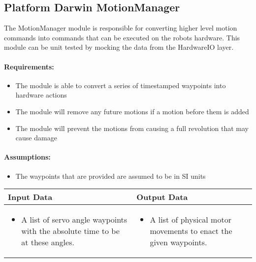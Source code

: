 \documentclass[english,12pt]{scrartcl}
\begin{document}
	\subsection{Platform Darwin MotionManager}
		The MotionManager module is responsible for converting higher level motion commands into commands that can be executed on the robots hardware.
		This module can be unit tested by mocking the data from the HardwareIO layer.

		\paragraph{Requirements:}
		\begin{itemize}
			\item The module is able to convert a series of timestamped waypoints into hardware actions
			\item The module will remove any future motions if a motion before them is added
			\item The module will prevent the motions from causing a full revolution that may cause damage
		\end{itemize}

		\paragraph{Assumptions:}
		\begin{itemize}
			\item The waypoints that are provided are assumed to be in SI units
		\end{itemize}

		\begin{tabular}{p{7cm}|p{7cm}}
			\textbf{Input Data} & \textbf{Output Data} \\ \hline
			\begin{itemize}
				\item A list of servo angle waypoints with the absolute time to be at these angles.
			\end{itemize}
			&
			\begin{itemize}
				\item A list of physical motor movements to enact the given waypoints.
			\end{itemize}
		\end{tabular}
\end{document}
